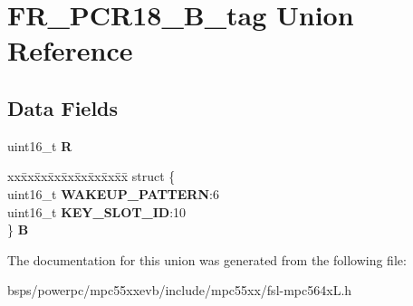 \hypertarget{unionFR__PCR18__16B__tag}{}\section{F\+R\+\_\+\+P\+C\+R18\+\_\+B\+\_\+tag Union Reference}
\label{unionFR__PCR18__16B__tag}
\subsection*{Data Fields}
\begin{DoxyCompactItemize}
\item 
\mbox{\label{unionFR__PCR18__16B__tag_a70e5e53ca6f54b575330ebad0543ddf1}} 
uint16\+\_\+t {\bfseries R}
\item 
\mbox{\label{unionFR__PCR18__16B__tag_a484fbecea1758658eeb1bc56f93104c6}} 
\begin{tabbing}
xx\=xx\=xx\=xx\=xx\=xx\=xx\=xx\=xx\=\kill
struct \{\\
\>uint16\_t {\bfseries WAKEUP\_PATTERN}:6\\
\>uint16\_t {\bfseries KEY\_SLOT\_ID}:10\\
\} {\bfseries B}\\

\end{tabbing}\end{DoxyCompactItemize}


The documentation for this union was generated from the following file\+:\begin{DoxyCompactItemize}
\item 
bsps/powerpc/mpc55xxevb/include/mpc55xx/fsl-\/mpc564x\+L.\+h\end{DoxyCompactItemize}
